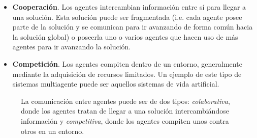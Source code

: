 \begin{itemize}
	\item \textbf{Cooperación}. Los agentes intercambian información entre sí para llegar a una solución. Esta solución puede ser fragmentada (i.e. cada agente posee parte de la solución y se comunican para ir avanzando de forma común hacia la solución global) o poseerla uno o varios agentes que hacen uso de más agentes para ir avanzando la solución.
	\item \textbf{Competición}. Los agentes compiten dentro de un entorno, generalmente mediante la adquisición de recursos limitados. Un ejemplo de este tipo de sistemas multiagente puede ser aquellos sistemas de vida artificial.
\end{itemize}

\begin{figure}
	\caption[Diferencias entre colaboración y competitividad de agentes.]{La comunicación entre agentes puede ser de dos tipos: \textit{colaborativa}, donde los agentes tratan de llegar a una solución intercambiándose información y \textit{competitiva}, donde los agentes compiten unos contra otros en un entorno.}
	\label{fig:communication-between-agents-in-mass}
\end{figure}
